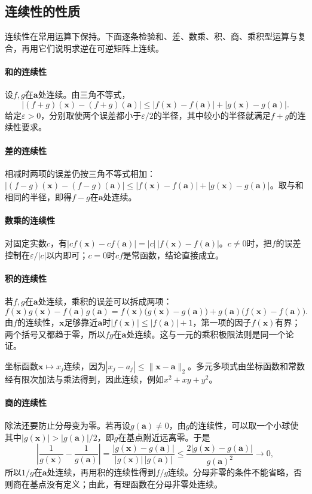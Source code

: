 \subsection{连续性的性质}
\label{sec:multivariable-continuity-properties}

连续性在常用运算下保持。下面逐条检验和、差、数乘、积、商、乘积型运算与复合，再用它们说明求逆在可逆矩阵上连续。

\paragraph{和的连续性}
设$f,g$在$\bm a$处连续。由三角不等式，
\[
 |(f+g)(\bm x)-(f+g)(\bm a)|\leq|f(\bm x)-f(\bm a)|+|g(\bm x)-g(\bm a)|.
\]
给定$\varepsilon>0$，分别取使两个误差都小于$\varepsilon/2$的半径，其中较小的半径就满足$f+g$的连续性要求。

\paragraph{差的连续性}
相减时两项的误差仍按三角不等式相加：$|(f-g)(\bm x)-(f-g)(\bm a)|\leq|f(\bm x)-f(\bm a)|+|g(\bm x)-g(\bm a)|$。取与和相同的半径，即得$f-g$在$\bm a$处连续。

\paragraph{数乘的连续性}
对固定实数$c$，有$|cf(\bm x)-cf(\bm a)|=|c|\,|f(\bm x)-f(\bm a)|$。$c\neq0$时，把$f$的误差控制在$\varepsilon/|c|$以内即可；$c=0$时$cf$是常函数，结论直接成立。

\paragraph{积的连续性}
若$f,g$在$\bm a$处连续，乘积的误差可以拆成两项：
\[
 f(\bm x)g(\bm x)-f(\bm a)g(\bm a)
 =f(\bm x)\bigl(g(\bm x)-g(\bm a)\bigr)+g(\bm a)\bigl(f(\bm x)-f(\bm a)\bigr).
\]
由$f$的连续性，$\bm x$足够靠近$\bm a$时$|f(\bm x)|\leq|f(\bm a)|+1$，第一项的因子$f(\bm x)$有界；两个括号又都趋于零，所以$fg$在$\bm a$处连续。这与一元的乘积极限法则是同一个论证。

坐标函数$\bm x\mapsto x_j$连续，因为$|x_j-a_j|\leq\lVert\bm x-\bm a\rVert_2$。多元多项式由坐标函数和常数经有限次加法与乘法得到，因此连续，例如$x^2+xy+y^2$。

\paragraph{商的连续性}
除法还要防止分母变为零。若再设$g(\bm a)\neq0$，由$g$的连续性，可以取一个小球使其中$|g(\bm x)|>|g(\bm a)|/2$，即$g$在基点附近远离零。于是
\[
 \left|\frac1{g(\bm x)}-\frac1{g(\bm a)}\right|
 =\frac{|g(\bm x)-g(\bm a)|}{|g(\bm x)|\,|g(\bm a)|}
 \leq\frac{2|g(\bm x)-g(\bm a)|}{g(\bm a)^2}\longrightarrow0,
\]
所以$1/g$在$\bm a$处连续，再用积的连续性得到$f/g$连续。分母非零的条件不能省略，否则商在基点没有定义；由此，有理函数在分母非零处连续。

